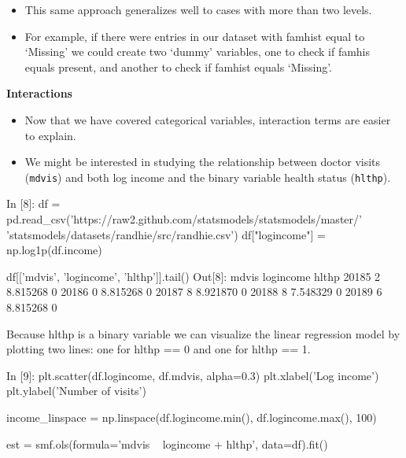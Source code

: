 \begin{frame}[fragile]
	\Large
	\begin{itemize}
	\item This same approach generalizes well to cases with more than two levels. 
	\item For example, if there were entries in our dataset with famhist equal to ‘Missing’ we could create two ‘dummy’ variables, one to check if famhis equals present, and another to check if famhist equals ‘Missing’.
	\end{itemize}

\end{frame}

\begin{frame}[fragile]
	\Large
\textbf{Interactions}
\begin{itemize}
\item Now that we have covered categorical variables, interaction terms are easier to explain.

\item We might be interested in studying the relationship between doctor visits (\texttt{mdvis}) and both log income and the binary variable health status (\texttt{hlthp}).
\end{itemize}

\end{frame}

\begin{frame}[fragile]
	\Large
In [8]:
df = pd.read_csv('https://raw2.github.com/statsmodels/statsmodels/master/'
                 'statsmodels/datasets/randhie/src/randhie.csv')
df["logincome"] = np.log1p(df.income)

df[['mdvis', 'logincome', 'hlthp']].tail()
Out[8]:
mdvis	logincome	hlthp
20185	2	8.815268	0
20186	0	8.815268	0
20187	8	8.921870	0
20188	8	7.548329	0
20189	6	8.815268	0
\end{frame}

\begin{frame}[fragile]
	\Large
Because hlthp is a binary variable we can visualize the linear regression model by plotting two lines: one for hlthp == 0 and one for hlthp == 1.
\end{frame}

\begin{frame}[fragile]
	\Large
In [9]:
plt.scatter(df.logincome, df.mdvis, alpha=0.3)
plt.xlabel('Log income')
plt.ylabel('Number of visits')

income_linspace = np.linspace(df.logincome.min(), df.logincome.max(), 100)

est = smf.ols(formula='mdvis ~ logincome + hlthp', data=df).fit()
\end{frame}

